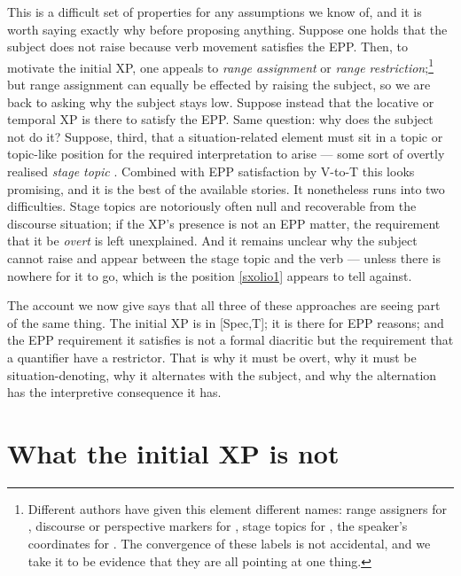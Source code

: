 \documentclass[11pt]{article}
\begin{document}
This is a difficult set of properties for any assumptions we know of, and it is worth saying exactly why before proposing anything.  Suppose one holds that the subject does not raise because verb movement satisfies the EPP.  Then, to motivate the initial XP, one appeals to \emph{range assignment} or \emph{range restriction};\footnote{Different authors have given this element different names: range assigners for \citet{Borer:05a}, discourse or perspective markers for \citet{alexiadou:11b}, stage topics for \citet{cohen-erteschik-shir:02}, the speaker's coordinates for \citet{giorgi:10}.  The convergence of these labels is not accidental, and we take it to be evidence that they are all pointing at one thing.} but range assignment can equally be effected by raising the subject, so we are back to asking why the subject stays low.  Suppose instead that the locative or temporal XP is there to satisfy the EPP.  Same question: why does the subject not do it?  Suppose, third, that a situation-related element must sit in a topic or topic-like position for the required interpretation to arise --- some sort of overtly realised \emph{stage topic} \citep{basilico:03}.  Combined with EPP satisfaction by V-to-T this looks promising, and it is the best of the available stories.  It nonetheless runs into two difficulties.  Stage topics are notoriously often null and recoverable from the discourse situation; if the XP's presence is not an EPP matter, the requirement that it be \emph{overt} is left unexplained.  And it remains unclear why the subject cannot raise and appear between the stage topic and the verb --- unless there is nowhere for it to go, which is the position \ref{sxolio1} appears to tell against.

The account we now give says that all three of these approaches are seeing part of the same thing.  The initial XP is in [Spec,T]; it is there for EPP reasons; and the EPP requirement it satisfies is not a formal diacritic but the requirement that a quantifier have a restrictor.  That is why it must be overt, why it must be situation-denoting, why it alternates with the subject, and why the alternation has the interpretive consequence it has.

\section{What the initial XP is not}\label{whatXP}
\end{document}
